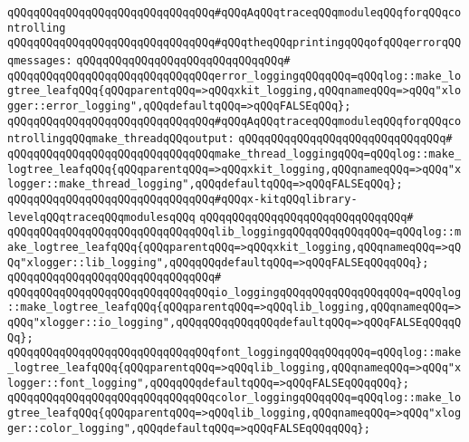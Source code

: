 \newline
\verb|qQQqqQQqqQQqqQQqqQQqqQQqqQQqqQQq#qQQqAqQQqtraceqQQqmoduleqQQqforqQQqcontrolling|\newline
\verb|qQQqqQQqqQQqqQQqqQQqqQQqqQQqqQQq#qQQqtheqQQqprintingqQQqofqQQqerrorqQQqmessages:|\newline
\verb|qQQqqQQqqQQqqQQqqQQqqQQqqQQqqQQq#|\newline
\verb|qQQqqQQqqQQqqQQqqQQqqQQqqQQqqQQqerror_loggingqQQqqQQq=qQQqlog::make_logtree_leafqQQq{qQQqparentqQQq=>qQQqxkit_logging,qQQqnameqQQq=>qQQq"xlogger::error_logging",qQQqdefaultqQQq=>qQQqFALSEqQQq};|\newline
\newline
\verb|qQQqqQQqqQQqqQQqqQQqqQQqqQQqqQQq#qQQqAqQQqtraceqQQqmoduleqQQqforqQQqcontrollingqQQqmake_threadqQQqoutput:|\newline
\verb|qQQqqQQqqQQqqQQqqQQqqQQqqQQqqQQq#|\newline
\verb|qQQqqQQqqQQqqQQqqQQqqQQqqQQqqQQqmake_thread_loggingqQQq=qQQqlog::make_logtree_leafqQQq{qQQqparentqQQq=>qQQqxkit_logging,qQQqnameqQQq=>qQQq"xlogger::make_thread_logging",qQQqdefaultqQQq=>qQQqFALSEqQQq};|\newline
\newline
\verb|qQQqqQQqqQQqqQQqqQQqqQQqqQQqqQQq#qQQqx-kitqQQqlibrary-levelqQQqtraceqQQqmodulesqQQq|\newline
\verb|qQQqqQQqqQQqqQQqqQQqqQQqqQQqqQQq#|\newline
\verb|qQQqqQQqqQQqqQQqqQQqqQQqqQQqqQQqlib_loggingqQQqqQQqqQQqqQQq=qQQqlog::make_logtree_leafqQQq{qQQqparentqQQq=>qQQqxkit_logging,qQQqnameqQQq=>qQQq"xlogger::lib_logging",qQQqqQQqdefaultqQQq=>qQQqFALSEqQQqqQQq};|\newline
\verb|qQQqqQQqqQQqqQQqqQQqqQQqqQQqqQQq#|\newline
\verb|qQQqqQQqqQQqqQQqqQQqqQQqqQQqqQQqio_loggingqQQqqQQqqQQqqQQqqQQq=qQQqlog::make_logtree_leafqQQq{qQQqparentqQQq=>qQQqlib_logging,qQQqnameqQQq=>qQQq"xlogger::io_logging",qQQqqQQqqQQqqQQqdefaultqQQq=>qQQqFALSEqQQqqQQq};|\newline
\verb|qQQqqQQqqQQqqQQqqQQqqQQqqQQqqQQqfont_loggingqQQqqQQqqQQq=qQQqlog::make_logtree_leafqQQq{qQQqparentqQQq=>qQQqlib_logging,qQQqnameqQQq=>qQQq"xlogger::font_logging",qQQqqQQqdefaultqQQq=>qQQqFALSEqQQqqQQq};|\newline
\verb|qQQqqQQqqQQqqQQqqQQqqQQqqQQqqQQqcolor_loggingqQQqqQQq=qQQqlog::make_logtree_leafqQQq{qQQqparentqQQq=>qQQqlib_logging,qQQqnameqQQq=>qQQq"xlogger::color_logging",qQQqdefaultqQQq=>qQQqFALSEqQQqqQQq};|\newline
